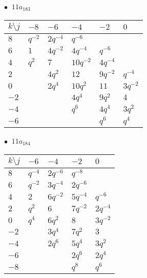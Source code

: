\begin{minipage}{\linewidth}
$\bullet\ $ $11a_{183}$ \vspace{0.5em} \\
\begin{tabular}{l|lllll}
$k \setminus j$ & $-8$ & $-6$ & $-4$ & $-2$ & $0$ \\
\hline
$8$ & $q^{-2}$ & $2q^{-4}$ & $q^{-6}$ &  &  \\
$6$ & $1$ & $4q^{-2}$ & $4q^{-4}$ & $q^{-6}$ &  \\
$4$ & $q^{2}$ & $7$ & $10q^{-2}$ & $4q^{-4}$ &  \\
$2$ &  & $4q^{2}$ & $12$ & $9q^{-2}$ & $q^{-4}$ \\
$0$ &  & $2q^{4}$ & $10q^{2}$ & $11$ & $3q^{-2}$ \\
$-2$ &  &  & $4q^{4}$ & $9q^{2}$ & $4$ \\
$-4$ &  &  & $q^{6}$ & $4q^{4}$ & $3q^{2}$ \\
$-6$ &  &  &  & $q^{6}$ & $q^{4}$ \\
\end{tabular}
\vspace{2em}
\end{minipage}
%
\begin{minipage}{\linewidth}
$\bullet\ $ $11a_{184}$ \vspace{0.5em} \\
\begin{tabular}{l|llll}
$k \setminus j$ & $-6$ & $-4$ & $-2$ & $0$ \\
\hline
$8$ & $q^{-4}$ & $2q^{-6}$ & $q^{-8}$ &  \\
$6$ & $q^{-2}$ & $3q^{-4}$ & $2q^{-6}$ &  \\
$4$ & $2$ & $6q^{-2}$ & $5q^{-4}$ & $q^{-6}$ \\
$2$ & $q^{2}$ & $6$ & $7q^{-2}$ & $2q^{-4}$ \\
$0$ & $q^{4}$ & $6q^{2}$ & $8$ & $3q^{-2}$ \\
$-2$ &  & $3q^{4}$ & $7q^{2}$ & $3$ \\
$-4$ &  & $2q^{6}$ & $5q^{4}$ & $3q^{2}$ \\
$-6$ &  &  & $2q^{6}$ & $2q^{4}$ \\
$-8$ &  &  & $q^{8}$ & $q^{6}$ \\
\end{tabular}
\vspace{2em}
\end{minipage}
%
